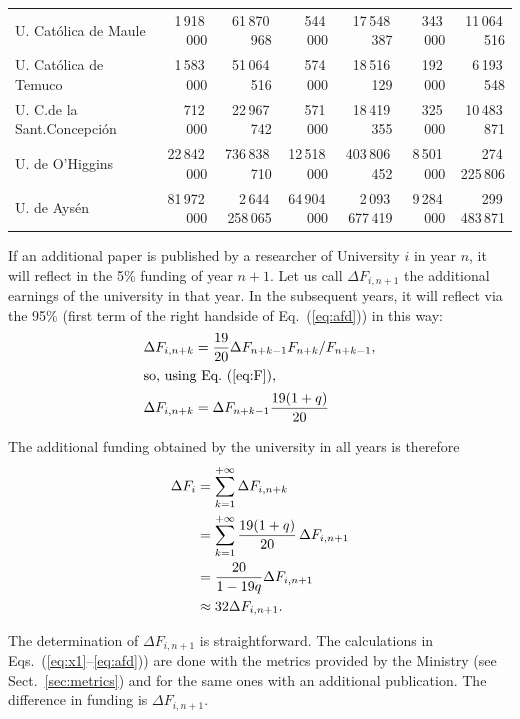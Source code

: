 \documentclass[twocolumn]{article}
\def\eqref#1{Eq.~(\ref{eq:#1})}
\def\eqsref#1#2{Eqs.~(\ref{eq:#1}--\ref{eq:#2})}
\begin{document}
\begin{table}[t]
\begin{tabular}{l rr rr rr}
U. Católica de Maule           &   1\,918\,000 &    61\,870\,968 &     544\,000 &    17\,548\,387 &     343\,000 &    11\,064\,516 \\
U. Católica de Temuco          &   1\,583\,000 &    51\,064\,516 &     574\,000 &    18\,516\,129 &     192\,000 &     6\,193\,548 \\
U. C.de la Sant.Concepción     &     712\,000 &    22\,967\,742 &     571\,000 &    18\,419\,355 &     325\,000 &    10\,483\,871 \\
U. de O'Higgins                &  22\,842\,000 &   736\,838\,710 &  12\,518\,000 &   403\,806\,452 &   8\,501\,000 &   274\,225\,806 \\
U. de Aysén                    &  81\,972\,000 & 2\,644\,258\,065 &  64\,904\,000 & 2\,093\,677\,419 &   9\,284\,000 &   299\,483\,871 \\
\hline
\end{tabular}
\end{table}



If an additional paper is published by a researcher of University $i$ in year $n$, it will reflect in 
the 5\% funding of year $n + 1$. Let us call $\Delta F_{i,n+1}$ the additional earnings 
of the university in that year.  In the subsequent years, it will reflect via the 95\% 
(first term of the right handside of \eqref{afd}) in this way:
\begin{align}
   \Delta F_{i,n+k} &=  \frac{19}{20} \Delta F_{n+k-1} F_{n+k}  / F_{n+k-1}, \notag\\
\intertext{so, using \eqref{F},}
   \Delta F_{i,n+k} &= \Delta F_{n+k-1}  \frac{ 19 (1 + q)} { 20}
\end{align}

The additional funding obtained by the university in all years is therefore
\begin{align}
    \Delta F_{i} &= \sum_{k=1}^{+\infty} \Delta F_{i,n+k} \notag \\
                 &= \sum_{k=1}^{+\infty} \frac{19(1 + q)}{20} \,\Delta F_{i,n+1} \notag \\
                 &= \frac{20} { 1 - 19q } \Delta F_{i,n+1}\\
                 &\approx 32 \Delta F_{i,n+1}. \notag
\end{align}

The determination of $\Delta F_{i,n+1}$ is straightforward.  The calculations
in \eqsref{x1}{afd}) are done with the metrics provided by the Ministry (see Sect.~\ref{sec:metrics}) and for the same ones with an additional publication.  The difference in funding is $\Delta F_{i,n+1}$. 
\end{document}
